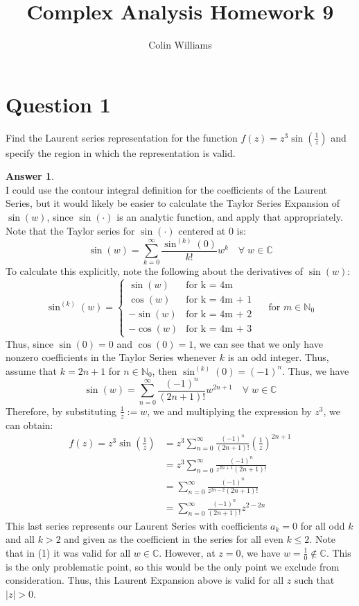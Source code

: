 \documentclass[10pt,a4paper]{article}
\title{Complex Analysis Homework 9}
\author{Colin Williams}
\theoremstyle{definition}
\newtheorem*{answer*}{Answer}
\begin{document}
\maketitle

\section*{Question 1}
Find the Laurent series representation for the function $f(z) = z^3 \sin \left(\frac{1}{z}\right)$ and specify the region in which the representation is valid.

\begin{answer*}{$ $}
\\I could use the contour integral definition for the coefficients of the Laurent Series, but it would likely be easier to calculate the Taylor Series Expansion of $\sin(w)$, since $\sin(\cdot)$ is an analytic function, and apply that appropriately. Note that the Taylor series for $\sin(\cdot)$ centered at 0 is:
\[
\sin(w) = \sum_{k = 0}^{\infty} \frac{\sin^{(k)}(0)}{k!}w^k \quad \forall \; w \in \mathbb{C}
\]
To calculate this explicitly, note the following about the derivatives of $\sin(w)$:
\[
\sin^{(k)}(w) = \begin{cases}
\sin(w) &\text{for k = 4m}\\
\cos(w) &\text{for k = 4m + 1}\\
-\sin(w) &\text{for k = 4m + 2}\\
-\cos(w) &\text{for k = 4m + 3}
\end{cases} \quad \text{ for } m \in \mathbb{N}_0
\]
Thus, since $\sin(0) = 0$ and $\cos(0) = 1$, we can see that we only have nonzero coefficients in the Taylor Series whenever $k$ is an odd integer. Thus, assume that $k = 2n + 1$ for $n \in \mathbb{N}_0$, then $\sin^{(k)}(0) = (-1)^n$. Thus, we have
\begin{equation}
\sin(w) = \sum_{n = 0}^{\infty} \frac{(-1)^n}{(2n + 1)!}w^{2n + 1} \quad \forall \; w \in \mathbb{C}
\end{equation}
Therefore, by substituting $\frac{1}{z} := w$, we and multiplying the expression by $z^3$, we can obtain:
\begin{align*}
f(z) = z^3\sin\left(\frac{1}{z}\right) &= z^3\sum_{n = 0}^{\infty} \frac{(-1)^n}{(2n + 1)!}\left(\frac{1}{z}\right)^{2n + 1}\\
&= z^3 \sum_{n = 0}^{\infty} \frac{(-1)^n}{z^{2n + 1}(2n + 1)!}\\
&= \sum_{n = 0}^{\infty} \frac{(-1)^n}{z^{2n - 2}(2n + 1)!}\\
&= \sum_{n = 0}^{\infty} \frac{(-1)^n}{(2n + 1)!}z^{2 - 2n}
\end{align*}
This last series represents our Laurent Series with coefficients $a_k = 0$ for all odd $k$ and all $k > 2$ and given as the coefficient in the series for all even $k \leq 2$. Note that in (1) it was valid for all $w \in \mathbb{C}$. However, at $z = 0$, we have $w = \frac{1}{0} \not\in \mathbb{C}$. This is the only problematic point, so this would be the only point we exclude from consideration. Thus, this Laurent Expansion above is valid for all $z$ such that $|z| > 0$.
\end{answer*}
\end{document}
